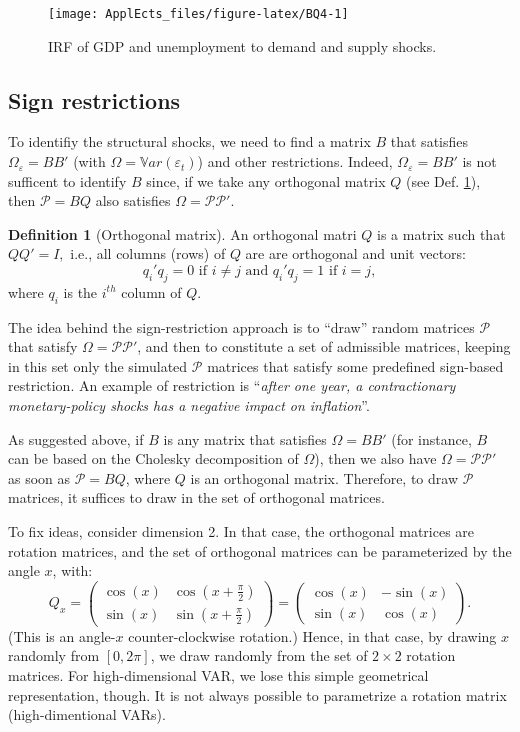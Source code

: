 \documentclass[
  12pt,
]{book}
\theoremstyle{definition}
\newtheorem{definition}{Definition}[chapter]
\theoremstyle{definition}
\theoremstyle{definition}
\theoremstyle{definition}
\theoremstyle{remark}
\begin{document}
\begin{figure}
\texttt{[image: ApplEcts\_files/figure-latex/BQ4-1]} \caption{IRF of GDP and unemployment to demand and supply shocks.}\label{fig:BQ4}
\end{figure}

\hypertarget{Signs}{%
\subsection{Sign restrictions}\label{Signs}}

To identifiy the structural shocks, we need to find a matrix \(B\) that satisfies \(\Omega_{\varepsilon} = BB'\) (with \(\Omega = \mathbb{V}ar(\varepsilon_t)\)) and other restrictions. Indeed, \(\Omega_{\varepsilon} = BB'\) is not sufficent to identify \(B\) since, if we take any orthogonal matrix \(Q\) (see Def. \ref{def:orthogonal}), then \(\mathcal{P}=BQ\) also satisfies \(\Omega = \mathcal{P}\mathcal{P}'\).

\begin{definition}[Orthogonal matrix]
\protect\hypertarget{def:orthogonal}{}\label{def:orthogonal}An orthogonal matri \(Q\) is a matrix such that \(QQ' = I,\) i.e., all columns (rows) of \(Q\) are are
orthogonal and unit vectors:
\[q_i'q_j=0\text{ if }i\neq j\text{ and }q_i'q_j=1\text{ if }i= j,\]
where \(q_i\) is the \(i^{th}\) column of \(Q\).
\end{definition}

The idea behind the sign-restriction approach is to ``draw'' random matrices \(\mathcal{P}\) that satisfy \(\Omega = \mathcal{P}\mathcal{P}'\), and then to constitute a set of admissible matrices, keeping in this set only the simulated \(\mathcal{P}\) matrices that satisfy some predefined sign-based restriction. An example of restriction is ``\emph{after one year, a contractionary monetary-policy shocks has a negative impact on inflation}''.

As suggested above, if \(B\) is any matrix that satisfies \(\Omega = BB'\) (for instance, \(B\) can be based on the Cholesky decomposition of \(\Omega\)), then we also have \(\Omega = \mathcal{P}\mathcal{P}'\) as soon as \(\mathcal{P}=BQ\), where \(Q\) is an orthogonal matrix. Therefore, to draw \(\mathcal{P}\) matrices, it suffices to draw in the set of orthogonal matrices.

To fix ideas, consider dimension 2. In that case, the orthogonal matrices are rotation matrices, and the set of orthogonal matrices can be parameterized by the angle \(x\), with:
\[
Q_x=\begin{pmatrix}\cos(x)&\cos\left(x+\frac{\pi}{2}\right)\\
\sin(x)&\sin\left(x+\frac{\pi}{2}\right)\end{pmatrix}=\begin{pmatrix}\cos(x)&-\sin(x)\\
\sin(x)&\cos(x)\end{pmatrix}.
\]
(This is an angle-\(x\) counter-clockwise rotation.) Hence, in that case, by drawing \(x\) randomly from \([0,2\pi]\), we draw randomly from the set of \(2\times2\) rotation matrices. For high-dimensional VAR, we lose this simple geometrical representation, though. It is not always possible to parametrize a rotation matrix (high-dimentional VARs).
\end{document}
